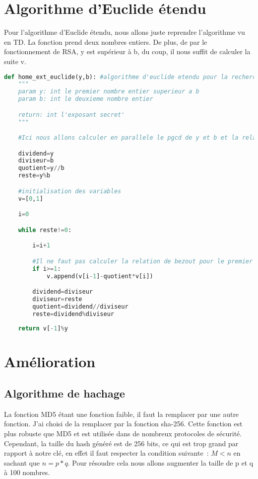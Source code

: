 \documentclass[12pt]{article}
\begin{document}
\section{Algorithme d'Euclide étendu}

Pour l'algorithme d'Euclide étendu, nous allons juste reprendre l'algorithme vu en TD.
La fonction prend deux nombres entiers. De plus, de par le fonctionnement de RSA, y est supérieur à b, du coup, il nous suffit de calculer la suite v.

\begin{lstlisting}[language=python]
    def home_ext_euclide(y,b): #algorithme d'euclide etendu pour la recherche de l'exposant secret
    """
    param y: int le premier nombre entier superieur a b
    param b: int le deuxieme nombre entier

    return: int l'exposant secret'
    """

    #Ici nous allons calculer en parallele le pgcd de y et b et la relation de Bezout

    dividend=y
    diviseur=b
    quotient=y//b
    reste=y%b

    #initialisation des variables
    v=[0,1]

    i=0

    while reste!=0:

        i=i+1

        #Il ne faut pas calculer la relation de bezout pour le premier quotient, en effet v0 v1 sont initialises.
        if i>=1:
            v.append(v[i-1]-quotient*v[i])

        dividend=diviseur
        diviseur=reste
        quotient=dividend//diviseur
        reste=dividend%diviseur
    
    return v[-1]%y
\end{lstlisting}

\section{Amélioration}

\subsection{Algorithme de hachage}

La fonction MD5 étant une fonction faible, il faut la remplacer par une autre fonction.
J'ai choisi de la remplacer par la fonction sha-256. Cette fonction est plus robuste que MD5 et est utilisée dans de nombreux protocoles de sécurité.
Cependant, la taille du hash généré est de 256 bits, ce qui est trop grand par rapport à notre clé, en effet il faut respecter la condition suivante : $M<n$ en sachant que $n = p*q$. Pour résoudre cela nous allons augmenter la taille de p et q à 100 nombres.
\end{document}
